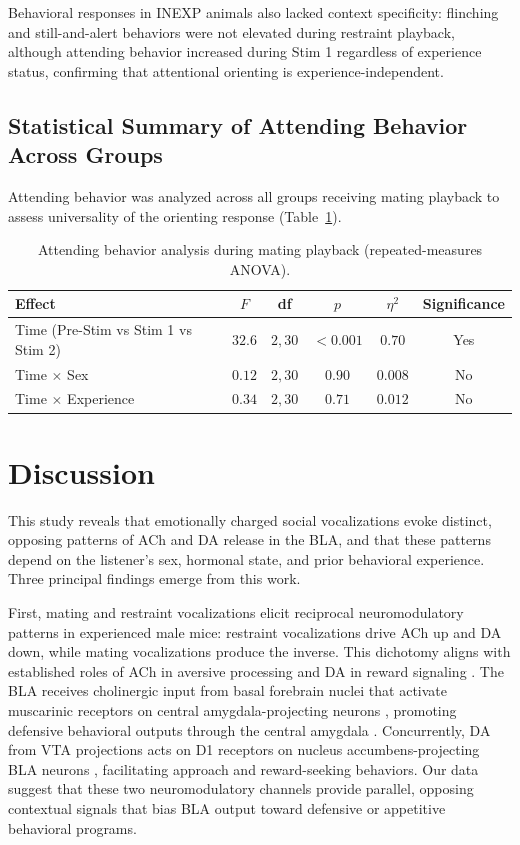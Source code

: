 \documentclass[11pt]{article}
\begin{document}
Behavioral responses in INEXP animals also lacked context specificity: flinching and still-and-alert behaviors were not elevated during restraint playback, although attending behavior increased during Stim 1 regardless of experience status, confirming that attentional orienting is experience-independent.

\subsection{Statistical Summary of Attending Behavior Across Groups}

Attending behavior was analyzed across all groups receiving mating playback to assess universality of the orienting response (Table~\ref{tab:attending}).

\begin{table}[H]
\centering
\caption{Attending behavior analysis during mating playback (repeated-measures ANOVA).}
\label{tab:attending}
\begin{tabular}{lccccc}
\toprule
\textbf{Effect} & \textbf{$F$} & \textbf{df} & \textbf{$p$} & \textbf{$\eta^2$} & \textbf{Significance} \\
\midrule
Time (Pre-Stim vs Stim 1 vs Stim 2) & $32.6$ & $2, 30$ & $<0.001$ & $0.70$ & Yes \\
Time $\times$ Sex & $0.12$ & $2, 30$ & $0.90$ & $0.008$ & No \\
Time $\times$ Experience & $0.34$ & $2, 30$ & $0.71$ & $0.012$ & No \\
\bottomrule
\end{tabular}
\end{table}

\section{Discussion}

This study reveals that emotionally charged social vocalizations evoke distinct, opposing patterns of ACh and DA release in the BLA, and that these patterns depend on the listener's sex, hormonal state, and prior behavioral experience. Three principal findings emerge from this work.

First, mating and restraint vocalizations elicit reciprocal neuromodulatory patterns in experienced male mice: restraint vocalizations drive ACh up and DA down, while mating vocalizations produce the inverse. This dichotomy aligns with established roles of ACh in aversive processing and DA in reward signaling \citep{hasselmo2006cholinergic, schultz2007multiple}. The BLA receives cholinergic input from basal forebrain nuclei that activate muscarinic receptors on central amygdala-projecting neurons \citep{baxter1999cholinergic, jiang2013cholinergic}, promoting defensive behavioral outputs through the central amygdala \citep{fadok2018new}. Concurrently, DA from VTA projections acts on D1 receptors on nucleus accumbens-projecting BLA neurons \citep{stuber2011excitatory}, facilitating approach and reward-seeking behaviors. Our data suggest that these two neuromodulatory channels provide parallel, opposing contextual signals that bias BLA output toward defensive or appetitive behavioral programs.
\end{document}
